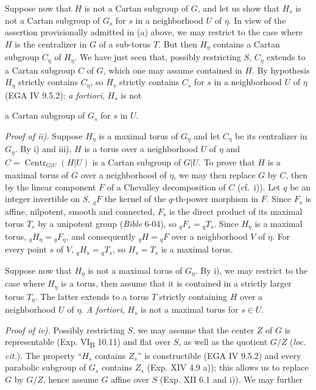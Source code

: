 Suppose now that \(H\) is not a Cartan subgroup of \(G\), and let us show that \(H_{s}\) is not a Cartan subgroup of \(G_{s}\)
for \(s\) in a neighborhood \(U\) of \(\eta\). In view of the assertion provisionally admitted in (a) above, we may restrict
to the case where \(H\) is the centralizer in \(G\) of a sub-torus \(T\). But then \(H_{\eta}\) contains a Cartan subgroup
\(C_{\eta}\) of \(H_{\eta}\). We have just seen that, possibly restricting \(S\), \(C_{\eta}\) extends to a Cartan subgroup \(C\)
of \(G\), which one may assume contained in \(H\). By hypothesis \(H_{\eta}\) strictly contains \(C_{\eta}\), so \(H_{s}\)
strictly contains \(C_{s}\) for \(s\) in a neighborhood \(U\) of \(\eta\) (EGA IV 9.5.2); \emph{a fortiori}, \(H_{s}\) is not

a Cartan subgroup of \(G_{s}\) for \(s\) in \(U\).

\emph{Proof of ii).} Suppose \(H_{\eta}\) is a maximal torus of \(G_{\eta}\) and let \(C_{\eta}\) be its centralizer in \(G_{\eta}\).
By i) and iii), \(H\) is a torus over a neighborhood \(U\) of \(\eta\) and \(C = \operatorname{Centr}_{G|U}(H|U)\) is a Cartan subgroup of
\(G|U\). To prove that \(H\) is a maximal torus of \(G\) over a neighborhood of \(\eta\), we may then replace \(G\) by \(C\), then
by the linear component \(F\) of a Chevalley decomposition of \(C\) (cf.~i)). Let \(q\) be an integer invertible on \(S\),
\({}_{q}F\) the kernel of the \(q\)-th-power morphism in \(F\). Since \(F_{s}\) is affine, nilpotent, smooth and connected,
\(F_{s}\) is the direct product of its maximal torus \(T_{s}\) by a unipotent group (\emph{Bible} 6-04), so
\({}_{q}F_s={}_{q}T_s\). Since \(H_{\eta}\) is a maximal torus,
\({}_{q}H_{\eta}={}_{q}F_{\eta}\), and consequently
\({}_{q}H={}_{q}F\) over a neighborhood \(V\) of \(\eta\).
For every point \(s\) of \(V\), \({}_{q}H_s={}_{q}T_s\), so
\(H_{s} = T_{s}\) is a maximal torus.

Suppose now that \(H_{\eta}\) is not a maximal torus of \(G_{\eta}\). By i), we may restrict to the case where \(H_{\eta}\) is
a torus, then assume that it is contained in a strictly larger torus \(T_{\eta}\). The latter extends to a torus \(T\)
strictly containing \(H\) over a neighborhood \(U\) of \(\eta\). \emph{A fortiori}, \(H_{s}\) is not a maximal torus for \(s \in U\).

\emph{Proof of iv).} Possibly restricting \(S\), we may assume that the center \(Z\) of \(G\) is representable (Exp. VI\textsubscript{B} 10.11)
and flat over \(S\), as well as the quotient \(G/Z\) (\emph{loc. cit.}). The property ``\(H_{s}\) contains \(Z_{s}\)'' is
constructible (EGA IV 9.5.2) and every parabolic subgroup of \(G_{s}\) contains \(Z_{s}\) (Exp. XIV 4.9 a)); this allows us
to replace \(G\) by \(G/Z\), hence assume \(G\) affine over \(S\) (Exp. XII 6.1 and i)). We may further

